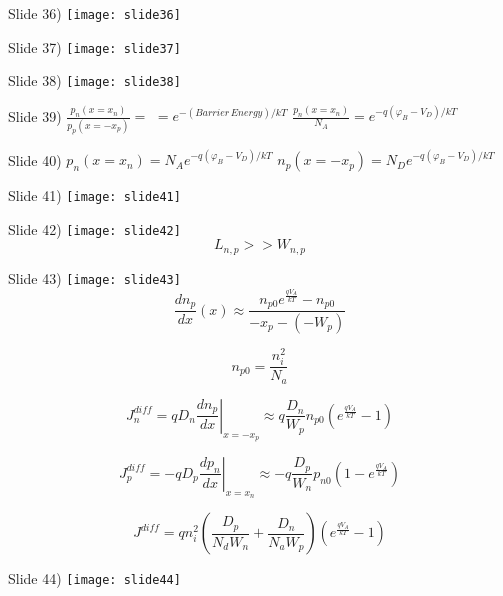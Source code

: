 \documentclass{beamer}
\begin{document}
\begin{frame}{Slide 36)}
\texttt{[image: slide36]}
\end{frame}

\begin{frame}{Slide 37)}
\texttt{[image: slide37]}
\end{frame}

\begin{frame}{Slide 38)}
\texttt{[image: slide38]}
\end{frame}

\begin{frame}{Slide 39)}
$\frac{{{p_n}(x = {x_n})}}{{{p_p}(x =  - {x_p})}} = $
$ = {e^{ - (Barrier\,Energy)/kT}}$
$\frac{{{p_n}(x = {x_n})}}{{{N_A}}} = {e^{ - q({\varphi _B} - {V_D})/kT}}$

\end{frame}

\begin{frame}{Slide 40)}
${p_n}(x = {x_n}) = {N_A}{e^{ - q({\varphi _B} - {V_D})/kT}}$
${n_p}(x =  - {x_p}) = {N_D}{e^{ - q({\varphi _B} - {V_D})/kT}}$
\end{frame}

\begin{frame}{Slide 41)}
\texttt{[image: slide41]}
\end{frame}

\begin{frame}{Slide 42)}
\texttt{[image: slide42]}
\[{L_{n,p}} >  > {W_{n,p}}\]
\end{frame}

\begin{frame}{Slide 43)}
\texttt{[image: slide43]}
\[\frac{{d{n_p}}}{{dx}}(x) \approx \frac{{{n_{p0}}{e^{\frac{{q{V_A}}}{{kT}}}} - {n_{p0}}}}{{ - {x_p} - ( - {W_p})}}\]

\[{n_{p0}} = \frac{{n_i^2}}{{{N_a}}}\]

\[J_n^{diff} = q{D_n}{\left. {\frac{{d{n_p}}}{{dx}}} \right|_{x =  - {x_p}}} \approx q\frac{{{D_n}}}{{{W_p}}}{n_{p0}}\left( {{e^{\frac{{q{V_A}}}{{kT}}}} - 1} \right)\]

\[J_p^{diff} =  - q{D_p}{\left. {\frac{{d{p_n}}}{{dx}}} \right|_{x = {x_n}}} \approx  - q\frac{{{D_p}}}{{{W_n}}}{p_{n0}}\left( {1 - {e^{\frac{{q{V_A}}}{{kT}}}}} \right)\]

\[J_{}^{diff} = qn_i^2\left( {\frac{{{D_p}}}{{{N_d}{W_n}}} + \frac{{{D_n}}}{{{N_a}{W_p}}}} \right)\left( {{e^{\frac{{q{V_A}}}{{kT}}}} - 1} \right)\]
\end{frame}

\begin{frame}{Slide 44)}
\texttt{[image: slide44]}
\end{frame}
\end{document}
